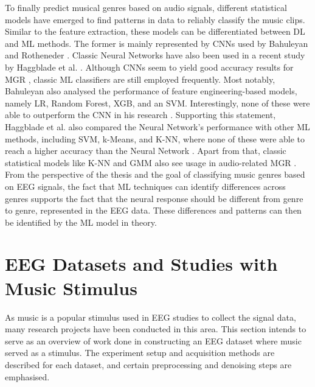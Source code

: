     To finally predict musical genres based on audio signals, different statistical models have emerged to find patterns in data to reliably classify the music clips. Similar to the feature extraction, these models can be differentiated between \ac{DL} and \ac{ML} methods. 
    The former is mainly represented by \ac{CNN}s used by Bahuleyan and Rotheneder \cite{bahuleyan2018music,rotheneder2023explanation}. Classic Neural Networks have also been used in a recent study by Haggblade et al. \cite{haggblade2011music}.
    Although \acp{CNN} seem to yield good accuracy results for \ac{MGR} \cite{bahuleyan2018music,haggblade2011music,rotheneder2023explanation}, classic \ac{ML} classifiers are still employed frequently. Most notably, Bahuleyan also analysed the performance of feature engineering-based models, namely \ac{LR}, Random Forest, \ac{XGB}, and an \ac{SVM}. Interestingly, none of these were able to outperform the \ac{CNN} in his research \cite{bahuleyan2018music}. Supporting this statement, Haggblade et al. also compared the Neural Network's performance with other \ac{ML} methods, including \ac{SVM}, k-Means, and \ac{K-NN}, where none of these were able to reach a higher accuracy than the Neural Network \cite{haggblade2011music}. Apart from that, classic statistical models like \ac{K-NN} and \ac{GMM} also see usage in audio-related \ac{MGR} \cite{tzanetakis2002musical}.
    From the perspective of the thesis and the goal of classifying music genres based on \ac{EEG} signals, the fact that \ac{ML} techniques can identify differences across genres supports the fact that the neural response should be different from genre to genre, represented in the \ac{EEG} data. These differences and patterns can then be identified by the \ac{ML} model in theory.

  \section{EEG Datasets and Studies with Music Stimulus}
    As music is a popular stimulus used in \ac{EEG} studies to collect the signal data, many research projects have been conducted in this area. This section intends to serve as an overview of work done in constructing an \ac{EEG} dataset where music served as a stimulus. The experiment setup and acquisition methods are described for each dataset, and certain preprocessing and denoising steps are emphasised.
